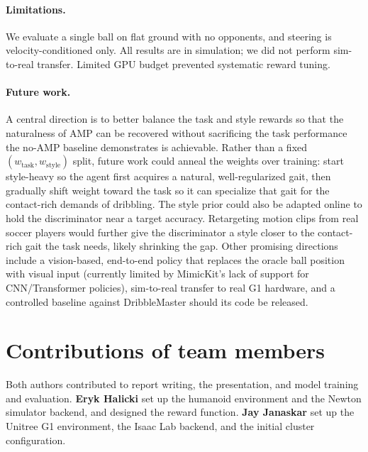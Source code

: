 \documentclass[10pt,twocolumn,letterpaper]{article}
\begin{document}
\paragraph{Limitations.}
We evaluate a single ball on flat ground with no opponents, and steering is
velocity-conditioned only. All results are in simulation; we did not perform
sim-to-real transfer. Limited GPU budget prevented systematic reward tuning.

\paragraph{Future work.}
A central direction is to better balance the task and style rewards so that the
naturalness of AMP can be recovered without sacrificing the task performance the
no-AMP baseline demonstrates is achievable. Rather than a fixed
$(w_\text{task}, w_\text{style})$ split, future work could anneal the weights
over training: start style-heavy so the agent first acquires a natural,
well-regularized gait, then gradually shift weight toward the task so it can
specialize that gait for the contact-rich demands of dribbling. The style prior
could also be adapted online to hold the discriminator near a target accuracy.
Retargeting motion clips from real soccer players would further give the
discriminator a style closer to the contact-rich gait the task needs, likely
shrinking the gap. Other promising directions include a vision-based,
end-to-end policy that replaces the oracle ball position with visual input
(currently limited by MimicKit's lack of support for CNN/Transformer policies),
sim-to-real transfer to real G1 hardware, and a controlled baseline against
DribbleMaster should its code be released.

\section{Contributions of team members}
Both authors contributed to report writing, the presentation, and model training
and evaluation. \textbf{Eryk Halicki} set up the humanoid environment and the
Newton simulator backend, and designed the reward function. \textbf{Jay
Janaskar} set up the Unitree G1 environment, the Isaac Lab backend, and the
initial cluster configuration.


{\small


}
\end{document}
